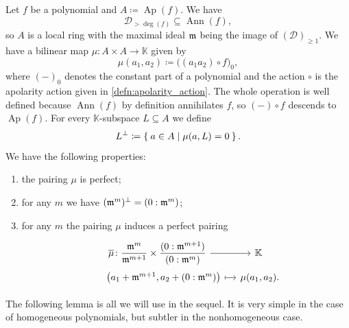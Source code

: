 \documentclass[a4paper,11pt,reqno]{amsart}
\newcommand{\calD}{\mathcal{D}}
\newcommand{\bbK}{\mathbb{K}}
\DeclareMathOperator{\Ann}{Ann}
\DeclareMathOperator{\Ap}{Ap}
\numberwithin{equation}{section}
\theoremstyle{definition}
\theoremstyle{plain}
\theoremstyle{remark}
\begin{document}
\newcommand{\mubar}{\overline{\mu}}%
Let $f$ be a polynomial and
$A \coloneq \Ap(f)$. We have
\[ \calD_{>\deg(f)} \subseteq \Ann(f),\] so
$A$ is {a local ring} with {the} maximal ideal $\mathfrak{m}$ being the image of $(\calD)_{\geq
1}$. We have a bilinear
map $\mu\colon A\times A\to \bbK$ given by
\[
    \mu(a_1, a_2) \coloneq \bigl((a_1a_2)\circ f\bigr)_0,
\]
where $(-)_0$ denotes the constant part of a polynomial and the action $\circ$ is
the apolarity action given in \autoref{defn:apolarity_action}. The whole operation is {well defined} because $\Ann(f)$
by definition annihilates $f$, so $(-)\circ f$ descends to $\Ap(f)$. For every $\bbK$-subspace $L\subseteq A$ we define
\[ L^{\perp} \coloneq \Set{ a\in A | \mu(a, L) = 0 }.\]
We have the following properties:
\begin{enumerate}[label=(\arabic*), left= 3pt, widest=2,nosep]
    \item the pairing $\mu$ is perfect;
    \item for any $m$ we have $(\mathfrak{m}^m)^{\perp} = (0:\mathfrak{m}^{m})$;
    \item for any $m$ the pairing $\mu$ induces a perfect pairing
\begin{equation}
\label{formula:mubar_perfect_pairing}
\begin{tikzcd}[row sep=0pt,column sep=1pc]
 \mubar\colon \dfrac{\mm^m}{\mm^{m+1}} \times \dfrac{(0:\mm^{m+1})}{(0:\mm^m)}\arrow[r] & \bbK\hphantom{.}\\
  {\hphantom{\mubar\colon{}}} \bigl(a_1 + \mm^{m+1}, a_2 + (0:\mm^{m})\bigr) \ar[r,mapsto] & \mu(a_1,a_2).
\end{tikzcd}
\end{equation}
\end{enumerate}
The following lemma is all we will use in the sequel. It is very {simple} in the case of homogeneous polynomials, but {subtler} in the nonhomogeneous case.
\end{document}

